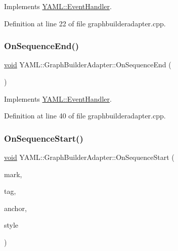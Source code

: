 Implements \mbox{\hyperlink{class_y_a_m_l_1_1_event_handler_a1f381a132754352eee6b8dcd218e3abc}{Y\+A\+M\+L\+::\+Event\+Handler}}.



Definition at line 22 of file graphbuilderadapter.\+cpp.

\mbox{\label{class_y_a_m_l_1_1_graph_builder_adapter_a69cada9fc86a780dc7d78c55a9b064cd}} 
\subsubsection{\texorpdfstring{OnSequenceEnd()}{OnSequenceEnd()}}
{\footnotesize\ttfamily \mbox{\hyperlink{glad_8h_a950fc91edb4504f62f1c577bf4727c29}{void}} Y\+A\+M\+L\+::\+Graph\+Builder\+Adapter\+::\+On\+Sequence\+End (\begin{DoxyParamCaption}{ }\end{DoxyParamCaption})\hspace{0.3cm}{\ttfamily [virtual]}}



Implements \mbox{\hyperlink{class_y_a_m_l_1_1_event_handler_a8b36cc36cd7067175b80b5d047aafaf3}{Y\+A\+M\+L\+::\+Event\+Handler}}.



Definition at line 40 of file graphbuilderadapter.\+cpp.

\mbox{\label{class_y_a_m_l_1_1_graph_builder_adapter_a97a9fdfd83c8a8a52f848a561116b24f}} 
\subsubsection{\texorpdfstring{OnSequenceStart()}{OnSequenceStart()}}
{\footnotesize\ttfamily \mbox{\hyperlink{glad_8h_a950fc91edb4504f62f1c577bf4727c29}{void}} Y\+A\+M\+L\+::\+Graph\+Builder\+Adapter\+::\+On\+Sequence\+Start (\begin{DoxyParamCaption}\item[{const \mbox{\hyperlink{struct_y_a_m_l_1_1_mark}{Mark}} \&}]{mark,  }\item[{const \mbox{\hyperlink{glad_8h_ac83513893df92266f79a515488701770}{std\+::string}} \&}]{tag,  }\item[{\mbox{\hyperlink{namespace_y_a_m_l_abeff1798814ae3402fc5665fdcad1de6}{anchor\+\_\+t}}}]{anchor,  }\item[{\mbox{\hyperlink{struct_y_a_m_l_1_1_emitter_style_ae86640662c85ce6062a37f9636b6959f}{Emitter\+Style\+::value}}}]{style }\end{DoxyParamCaption})\hspace{0.3cm}{\ttfamily [virtual]}}



